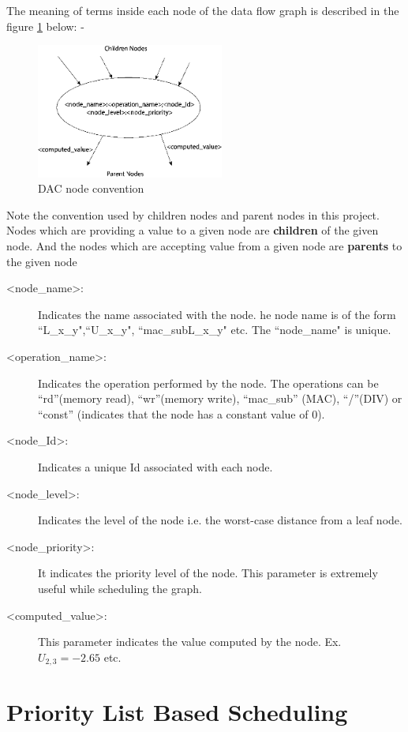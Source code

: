 The meaning of terms inside each node of the data flow graph is described in the figure \ref{fig:DAG_mean} below: -
\begin{figure}[H]
    \centering
    \includegraphics[width = 0.55\textwidth]{./Scheduler/image45.png}
    \caption{DAC node convention}
    \label{fig:DAG_mean}
\end{figure}
Note the convention used by children nodes and parent nodes in this project. Nodes which are providing a value to a given node are \textbf{children} of the given node. And the nodes which are accepting value from a given node are \textbf{parents} to the given node

\begin{description}
    \item[<node\_name>:] Indicates the name associated with the node. he node name is of the form ``L\_x\_y",``U\_x\_y", ``mac\_subL\_x\_y" etc. The ``node\_name" is unique.
    \item[<operation\_name>:] Indicates the operation performed by the node. The operations can be ``rd”(memory read), ``wr”(memory write), ``mac\_sub” (MAC), ``/”(DIV) or ``const” (indicates that the node has a constant value of 0).
    \item[<node\_Id>:] Indicates a unique Id associated with each node.
    \item[<node\_level>:] Indicates the level of the node i.e. the worst-case distance from a leaf node.
    \item[<node\_priority>:] It indicates the priority level of the node. This parameter is extremely useful while scheduling the graph.
    \item[<computed\_value>:] This parameter indicates the value computed by the node. Ex. $U_{2,3} = -2.65$ etc.
\end{description}

\section{Priority List Based Scheduling}

